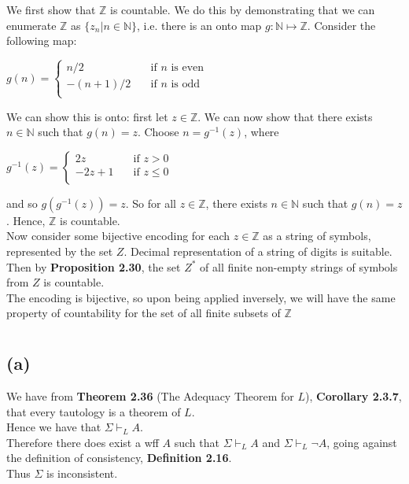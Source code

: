 \documentclass[11pt,oneside,a4paper]{article}
\begin{document}
\section{}
We first show that $\mathbb{Z}$ is countable. We do this by demonstrating that we can enumerate $\mathbb{Z}$ as $\{ z_n | n \in \mathbb{N} \}$, i.e. there is an onto map $g:\mathbb{N} \mapsto \mathbb{Z}$. Consider the following map:
\begin{center}
$g(n) =
\begin{cases}
n/2 & \quad \text{if } n \text{ is even}\\
-(n+1)/2 & \quad \text{if } n \text{ is odd}\\
\end{cases}$
\end{center}
We can show this is onto: first let $z \in \mathbb{Z}$. We can now show that there exists $n \in \mathbb{N}$ such that $g(n)=z$. Choose $n=g^{-1}(z)$, where
\begin{center}
$g^{-1}(z) =
\begin{cases}
2z & \quad \text{if } z > 0\\
-2z+1 & \quad \text{if } z \leq 0\\
\end{cases}$
\end{center}

and so $g(g^{-1}(z))=z$. So for all $z \in \mathbb{Z}$, there exists $n \in \mathbb{N}$ such that $g(n)=z$. Hence, $\mathbb{Z}$ is countable.\\
Now consider some bijective encoding for each $z \in \mathbb{Z}$ as a string of symbols, represented by the set $Z$. Decimal representation of a string of digits is suitable. Then by \textbf{Proposition 2.30}, the set $Z^*$ of all finite non-empty strings of symbols from $Z$ is countable.\\
The encoding is bijective, so upon being applied inversely, we will have the same property of countability for the set of all finite subsets of $\mathbb{Z}$

\section{}
\subsection*{(a)}
We have from \textbf{Theorem 2.36} (The Adequacy Theorem for $L$), \textbf{Corollary 2.3.7}, that every tautology is a theorem of $L$.\\
Hence we have that $\Sigma \vdash_L A$.\\
 Therefore there does exist a wff $A$ such that $\Sigma \vdash_L A$ and $\Sigma \vdash_L \neg A$, going against the definition of consistency, \textbf{Definition 2.16}.\\
Thus $\Sigma$ is inconsistent.
\end{document}
